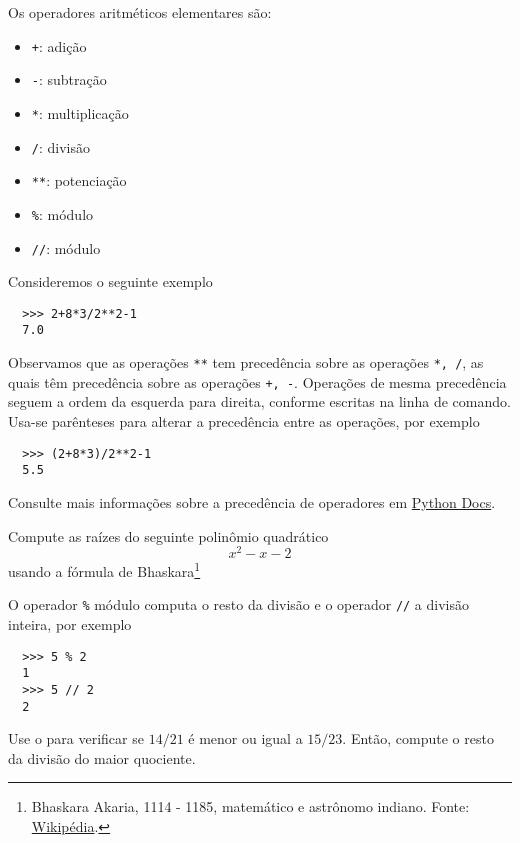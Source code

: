 \documentclass[12pt]{article}
\begin{document}
Os operadores aritméticos elementares são:
\begin{itemize}
\item[]\lstinline-+-: adição
\item[]\lstinline+-+: subtração
\item[]\lstinline+*+: multiplicação
\item[]\lstinline+/+: divisão
\item[]\lstinline+**+: potenciação
\item[]\lstinline+%+: módulo
\item[]\lstinline+//+: módulo
\end{itemize}

Consideremos o seguinte exemplo
\begin{lstlisting}
  >>> 2+8*3/2**2-1
  7.0
\end{lstlisting}
Observamos que as operações \lstinline+**+ tem precedência sobre as operações \lstinline+*, /+, as quais têm precedência sobre as operações \lstinline!+, -!. Operações de mesma precedência seguem a ordem da esquerda para direita, conforme escritas na linha de comando. Usa-se parênteses para alterar a precedência entre as operações, por exemplo
\begin{lstlisting}
  >>> (2+8*3)/2**2-1
  5.5
\end{lstlisting}
Consulte mais informações sobre a precedência de operadores em \href{https://docs.python.org/3/reference/expressions.html#operator-precedence}{Python Docs}.

\begin{exr}
  Compute as raízes do seguinte polinômio quadrático
  \begin{equation}
    x^2 - x - 2
  \end{equation}
  usando a fórmula de Bhaskara\footnote{Bhaskara Akaria, 1114 - 1185, matemático e astrônomo indiano. Fonte: \href{https://pt.wikipedia.org/wiki/Bhaskara\_II}{Wikipédia}.}
\end{exr}

O operador \lstinline+%+ módulo computa o resto da divisão e o operador \lstinline+//+ a divisão inteira, por exemplo
\begin{lstlisting}
  >>> 5 % 2
  1
  >>> 5 // 2
  2
\end{lstlisting}

\begin{exr}
  Use o {\python} para verificar se $14/21$ é menor ou igual a $15/23$. Então, compute o resto da divisão do maior quociente.
\end{exr}
\end{document}
